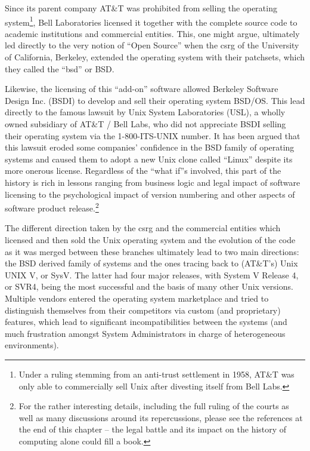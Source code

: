 Since its parent company  AT\&T was
prohibited from selling the operating
system\footnote{Under a ruling stemming from an
anti-trust settlement in
1958\cite{history:esr-taoup}, AT\&T was only able to
commercially sell Unix after divesting itself from
Bell Labs.}, Bell Laboratories licensed it together with the complete
source code to academic institutions and commercial
entities.  This, one might argue, ultimately led
directly to the very notion of ``Open
Source'' when the \gls{csrg} of the
University of California, Berkeley, extended the
operating system with their patchsets, which they
called the ``\acrlong{bsd}'' or BSD.

Likewise, the licensing of this ``add-on'' software
allowed Berkeley Software Design Inc. (BSDI) to
develop and sell their operating system BSD/OS.  This
lead directly to the famous
lawsuit\cite{history:bsdisuit} by Unix System
Laboratories (USL), a wholly owned subsidiary of AT\&T
/ Bell Labs, who did not appreciate BSDI selling their
operating system via the 1-800-ITS-UNIX number.  It
has been argued that this lawsuit eroded some
companies' confidence in the BSD family of operating
systems and caused them to adopt a new Unix clone
called ``Linux'' despite its more onerous
license.  Regardless of the ``what if''s involved,
this part of the history is rich in lessons ranging
from business logic and legal impact of software
licensing to the psychological impact of version
numbering and other aspects of software product
release.\footnote{For the rather interesting
details, including the full ruling of the courts as
well as many discussions around its repercussions,
please see the references at the end of this chapter
-- the legal battle and its impact on the history of
computing alone could fill a book.}

The different direction taken by the \gls{csrg} and the
commercial entities which licensed and then sold the
Unix operating system and the evolution of the code as
it was merged between these branches ultimately lead
to two main directions: the BSD derived family of
systems and the ones tracing back to (AT\&T's) Unix
UNIX V, or SysV.  The latter had
four major releases, with System V Release 4, or
SVR4, being the most successful and the
basis of many other Unix versions.  Multiple vendors
entered the operating system marketplace and tried to
distinguish themselves from their competitors via
custom (and proprietary) features, which lead to
significant incompatibilities between the systems (and
much frustration amongst System Administrators in
charge of heterogeneous environments).

